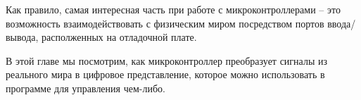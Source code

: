 \documentclass[../sparc.tex]{subfiles}
\begin{document}
\begin{figure}[ht]
  \centering
\end{figure}

Как правило, самая интересная часть при работе с микроконтроллерами -- это
возможность взаимодействовать с физическим миром посредством портов
ввода/вывода, располженных на отладочной плате.

В этой главе мы посмотрим, как микроконтроллер преобразует сигналы из реального
мира в цифровое представление, которое можно использовать в программе для
управления чем-либо.
\end{document}
